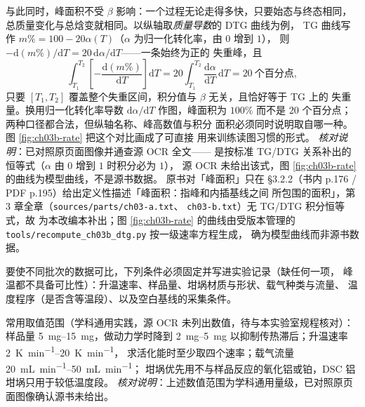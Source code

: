 \begin{principle}
与此同时，峰面积不受 $\beta$ 影响：一个过程无论走得多快，只要始态与终态相同，
总质量变化与总焓变就相同。以纵轴取\emph{质量导数}的 DTG 曲线为例，
TG 曲线写作 $m\%=100-20\alpha(T)$（$\alpha$ 为归一化转化率，由 $0$ 增到 $1$），
则 $-\mathrm{d}(m\%)/\mathrm{d}T=20\,\mathrm{d}\alpha/\mathrm{d}T$——一条始终为正的
失重峰，且
\begin{equation}
\int_{T_1}^{T_2}\left[-\frac{\mathrm{d}(m\%)}{\mathrm{d}T}\right]\mathrm{d}T
=20\int_{T_1}^{T_2}\frac{\mathrm{d}\alpha}{\mathrm{d}T}\,\mathrm{d}T
=20\ \text{个百分点},
\label{eq:ch03b-dtg-area}
\end{equation}
只要 $[T_1,T_2]$ 覆盖整个失重区间，积分值与 $\beta$ 无关，且恰好等于 TG 上的
失重量。换用归一化转化率导数 $\mathrm{d}\alpha/\mathrm{d}T$ 作图，峰面积为
$100\%$ 而不是 $20$ 个百分点；两种口径都合法，但纵轴名称、峰高数值与积分
面积必须同时说明取自哪一种。图 \ref{fig:ch03b-rate} 把这个对比画成了可直接
用来训练读图习惯的形式。
\emph{核对说明}：已对照原页面图像并通查源 OCR 全文——
是按标准 TG/DTG 关系补出的恒等式（$\alpha$ 由 $0$ 增到 $1$ 时积分必为 $1$），
源 OCR 未给出该式，图 \ref{fig:ch03b-rate} 的曲线为模型曲线，不是源书数据。
原书对「峰面积」只在
§3.2.2（书内 p.176 / PDF p.195）给出定义性描述「峰面积：指峰和内插基线之间
所包围的面积」，第 3 章全章（\texttt{sources/parts/ch03-a.txt}、
\texttt{ch03-b.txt}）无 TG/DTG 积分恒等式，故 
为本改编本补出；图 \ref{fig:ch03b-rate} 的曲线由受版本管理的
\texttt{tools/recompute\_ch03b\_dtg.py} 按一级速率方程生成，
确为模型曲线而非源书数据。
\end{principle}

\begin{measure}
要使不同批次的数据可比，下列条件必须固定并写进实验记录（缺任何一项，
峰温都不具备可比性）：升温速率、样品量、坩埚材质与形状、载气种类与流量、
温度程序（是否含等温段）、以及空白基线的采集条件。

常用取值范围（学科通用实践，源 OCR 未列出数值，待与本实验室规程核对）：
样品量 \qty{5}{mg}--\qty{15}{mg}，做动力学时降到 \qty{2}{mg}--\qty{5}{mg}
以抑制传热滞后；升温速率 \qty{2}{K.min^{-1}}--\qty{20}{K.min^{-1}}，
求活化能时至少取四个速率；载气流量 \qty{20}{mL.min^{-1}}--\qty{50}{mL.min^{-1}}；
坩埚优先用不与样品反应的氧化铝或铂，DSC 铝坩埚只用于较低温度段。
\emph{核对说明}：上述数值范围为学科通用量级，已对照原页面图像确认源书未给出。
\end{measure}

